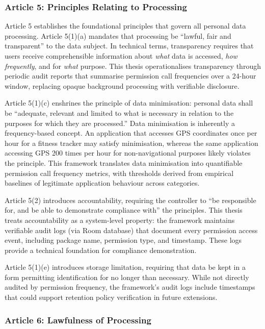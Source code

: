 \subsubsection{Article 5: Principles Relating to Processing}

Article 5 establishes the foundational principles that govern all personal data processing. Article 5(1)(a) mandates that processing be ``lawful, fair and transparent'' to the data subject. In technical terms, transparency requires that users receive comprehensible information about \emph{what} data is accessed, \emph{how frequently}, and for \emph{what} purpose. This thesis operationalises transparency through periodic audit reports that summarise permission call frequencies over a 24-hour window, replacing opaque background processing with verifiable disclosure.

Article 5(1)(c) enshrines the principle of data minimisation: personal data shall be ``adequate, relevant and limited to what is necessary in relation to the purposes for which they are processed.'' Data minimisation is inherently a frequency-based concept. An application that accesses GPS coordinates once per hour for a fitness tracker may satisfy minimisation, whereas the same application accessing GPS 200 times per hour for non-navigational purposes likely violates the principle. This framework translates data minimisation into quantifiable permission call frequency metrics, with thresholds derived from empirical baselines of legitimate application behaviour across categories.

Article 5(2) introduces accountability, requiring the controller to ``be responsible for, and be able to demonstrate compliance with'' the principles. This thesis treats accountability as a system-level property: the framework maintains verifiable audit logs (via Room database) that document every permission access event, including package name, permission type, and timestamp. These logs provide a technical foundation for compliance demonstration.

Article 5(1)(e) introduces storage limitation, requiring that data be kept in a form permitting identification for no longer than necessary. While not directly audited by permission frequency, the framework's audit logs include timestamps that could support retention policy verification in future extensions.

\subsubsection{Article 6: Lawfulness of Processing}

